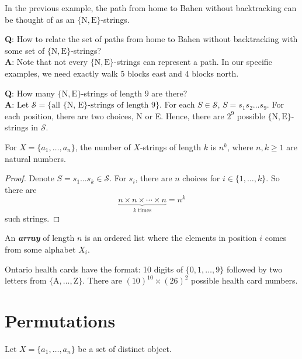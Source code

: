 In the previous example, the path from home to Bahen without backtracking can be thought of as an $\{\text{N},\text{E}\}$-strings.

\textbf{Q}: How to relate the set of paths from home to Bahen without backtracking with some set of $\{\text{N},\text{E}\}$-strings? \\
\textbf{A}: Note that not every $\{\text{N},\text{E}\}$-strings can represent a path. In our specific examples, we need exactly walk $5$ blocks east and $4$ blocks north.

\textbf{Q}: How many $\{\text{N},\text{E}\}$-strings of length $9$ are there? \\
\textbf{A}: Let $\mathcal{S} = \{\text{all $\{$N, E$\}$-strings of length 9}\}$. For each $S \in \mathcal{S}$, $S = s_1s_2\ldots s_9$. For each position, there are two choices, N or E. Hence, there are $2^9$ possible $\{\text{N},\text{E}\}$-strings in $\mathcal{S}$.

\begin{theorem}
   For $X = \{a_1,\ldots,a_n\}$, the number of $X$-strings of length $k$ is $n^k$, where $n,k \geq 1$ are natural numbers.
\end{theorem}

\begin{proof}
   Denote $S = s_1\ldots s_k \in \mathcal{S}$. For $s_i$, there are $n$ choices for $i \in \{1, \ldots, k\}$. So there are
   $$
   \underbrace{n \times n \times \cdots \times n}_{\text{$k$ times}} = n^k
   $$
   such strings.
\end{proof}

\begin{definition}[Array]
   An \textit{\textbf{array}} of length $n$ is an ordered list where the elements in position $i$ comes from some alphabet $X_i$.
\end{definition}

\begin{example}
   Ontario health cards have the format: 10 digits of $\{0,1,\ldots,9\}$ followed by two letters from $\mathrm{\{A,\ldots,Z\}}$. There are $(10)^{10} \times (26)^2$ possible health card numbers.
\end{example}

\section{Permutations}

Let $X = \{a_1,\ldots,a_n \}$ be a set of distinct object.

